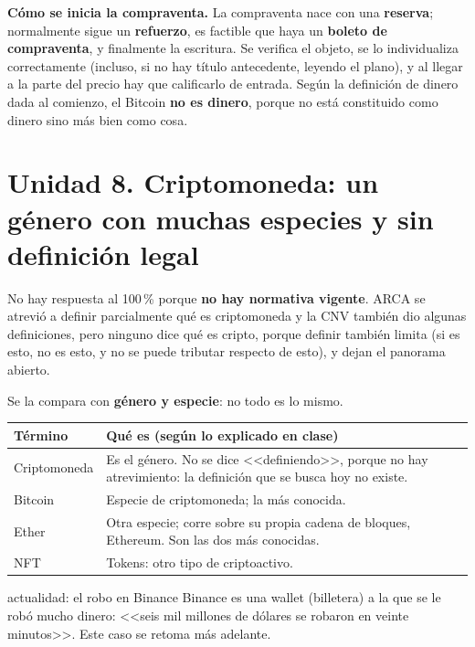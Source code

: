 \documentclass[12pt,oneside,a4paper]{book}
\begin{document}
\textbf{Cómo se inicia la compraventa.} La compraventa nace con una \textbf{reserva}; normalmente sigue un \textbf{refuerzo}, es factible que haya un \textbf{boleto de compraventa}, y finalmente la escritura. Se verifica el objeto, se lo individualiza correctamente (incluso, si no hay título antecedente, leyendo el plano), y al llegar a la parte del precio hay que calificarlo de entrada. Según la definición de dinero dada al comienzo, el Bitcoin \textbf{no es dinero}, porque no está constituido como dinero sino más bien como cosa.

\section{Unidad 8. Criptomoneda: un género con muchas especies y sin definición legal}

No hay respuesta al 100\,\% porque \textbf{no hay normativa vigente}. ARCA se atrevió a definir parcialmente qué es criptomoneda y la CNV también dio algunas definiciones, pero ninguno dice qué es cripto, porque definir también limita (si es esto, no es esto, y no se puede tributar respecto de esto), y dejan el panorama abierto.

Se la compara con \textbf{género y especie}: no todo es lo mismo.

\begin{longtable}{@{}>{\RaggedRight\arraybackslash}p{}>{\RaggedRight\arraybackslash}p{}@{}}
\toprule
\textbf{Término} & \textbf{Qué es (según lo explicado en clase)} \\
\midrule
\endhead
Criptomoneda & Es el género. No se dice <<definiendo>>, porque no hay atrevimiento: la definición que se busca hoy no existe. \\
\addlinespace
Bitcoin & Especie de criptomoneda; la más conocida. \\
\addlinespace
Ether & Otra especie; corre sobre su propia cadena de bloques, Ethereum. Son las dos más conocidas. \\
\addlinespace
NFT & Tokens: otro tipo de criptoactivo. \\
\bottomrule
\end{longtable}

\begin{example}{actualidad: el robo en Binance}
Binance es una wallet (billetera) a la que se le robó mucho dinero: <<seis mil millones de dólares se robaron en veinte minutos>>. Este caso se retoma más adelante.
\end{example}
\end{document}
